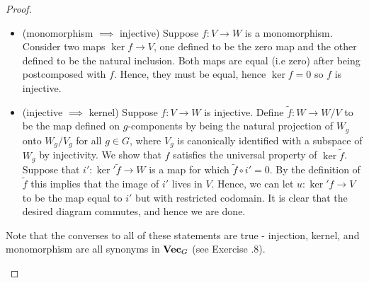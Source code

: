 \documentclass{article}
\theoremstyle{definition}
\numberwithin{figure}{section}
\begin{document}
\begin{proof}
\begin{enumerate}
\begin{itemize}
\item (monomorphism $\implies$ injective) Suppose $f:V\to W$ is a monomorphism. Consider two maps $\ker f\to V$, one defined to be the zero map and the other defined to be the natural inclusion. Both maps are equal (i.e zero) after being postcomposed with $f$. Hence, they must be equal, hence $\ker f =0$ so $f$ is injective.

\item (injective $\implies$ kernel) Suppose $f: V\to W$ is injective. Define $\tilde{f}: W\to W/V$ to be the map defined on $g$-components by being the natural projection of $W_g$ onto $W_g/V_g$ for all $g\in G$, where $V_g$ is canonically identified with a subspace of $W_g$ by injectivity. We show that $f$ satisfies the universal property of $\ker \tilde{f}$. Suppose that $i':\ker' \tilde{f}\to W$ is a map for which $\tilde{f}\circ i'=0$. By the definition of $\tilde{f}$ this implies that the image of $i'$ lives in $V$. Hence, we can let $u: \ker' f\to V$ to be the map equal to $i'$ but with restricted codomain. It is clear that the desired diagram commutes, and hence we are done.
\end{itemize}

Note that the converses to all of these statements are true - injection, kernel, and monomorphism are all synonyms in $\bold{Vec}_G$ (see Exercise \thesection.8).
\end{enumerate}
\end{proof}
\end{document}
